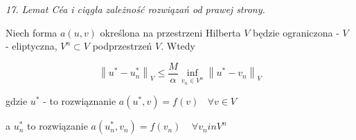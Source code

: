 \textit{17. Lemat Céa i ciągła zależność rozwiązań od prawej strony.}

Niech forma $a(u,v)$ określona na przestrzeni Hilberta $V$ będzie ograniczona - $V$ - eliptyczna, $V^n \subset V$ podprzestrzeń $V$. Wtedy

\[ \left \| u^* - u^*_n \right \|_V \leqslant \frac{M}{\alpha} \inf_{v_n \in V^n} \left \| u^* - v_n \right \|_V \]

gdzie $u^*$ - to rozwiąznanie $a(u^*,v) = f(v)\ \ \ \ \forall v \in V$

a $u_n^*$ to rozwiązanie $a(u^*_n,v_n) = f(v_n)\ \ \ \ \ \forall v_n in V^n$

